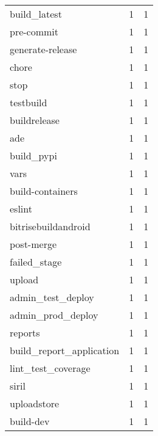 \begin{tabular}{lrr}
build\_latest               &                   1 &             1 \\
pre-commit                 &                   1 &             1 \\
generate-release           &                   1 &             1 \\
chore                      &                   1 &             1 \\
stop                       &                   1 &             1 \\
testbuild                  &                   1 &             1 \\
buildrelease               &                   1 &             1 \\
ade                        &                   1 &             1 \\
build\_pypi                 &                   1 &             1 \\
vars                       &                   1 &             1 \\
build-containers           &                   1 &             1 \\
eslint                     &                   1 &             1 \\
bitrisebuildandroid        &                   1 &             1 \\
post-merge                 &                   1 &             1 \\
failed\_stage               &                   1 &             1 \\
upload                     &                   1 &             1 \\
admin\_test\_deploy          &                   1 &             1 \\
admin\_prod\_deploy          &                   1 &             1 \\
reports                    &                   1 &             1 \\
build\_report\_application   &                   1 &             1 \\
lint\_test\_coverage         &                   1 &             1 \\
siril                      &                   1 &             1 \\
uploadstore                &                   1 &             1 \\
build-dev                  &                   1 &             1 \\

\end{tabular}
